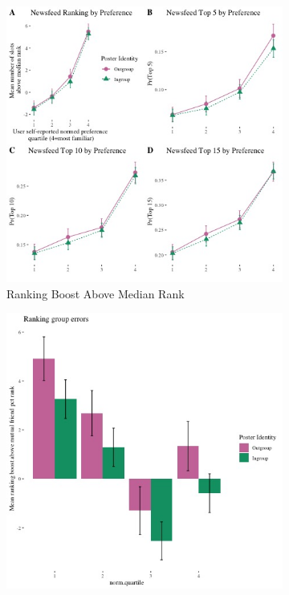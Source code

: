\documentclass[12pt,letterpaper]{article}
\begin{document}
\begin{figure}[ht]
\caption{Relationship between PYMK Algorithmic Ranking and In-group Status conditional on Subject Familiarity}
\label{fig:pymk_main}
    \begin{subfigure}{.5\textwidth} 
        \centering
        \includegraphics[width=1\linewidth]{Output/Graphs/Audit/Ranking line graphs/US PYMK all outcomes panel by norm preference by ingroup.jpg} 
        \caption{Ranking Boost Above Median Rank}
        \label{fig:pymk_line}
        \end{subfigure}
    \begin{subfigure}{.5\textwidth}
        \centering
        \includegraphics[width=1\linewidth]{Output/Graphs/Audit/Misranking relative to expectation/Mutual friends expectation/US PYMK by norm pref.jpg}  

\end{subfigure}
\end{figure}
\end{document}
